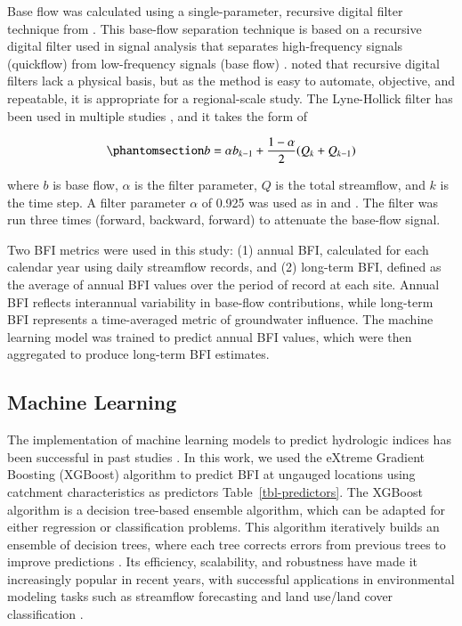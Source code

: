 \documentclass[
  authoryear,
  preprint,
  1p,
  onecolumn]{elsarticle}
\begin{document}
Base flow was calculated using a single-parameter, recursive digital
filter technique from \citet{nathan1990}. This base-flow separation
technique is based on a recursive digital filter used in signal analysis
that separates high-frequency signals (quickflow) from low-frequency
signals (base flow) \citep{lyne1979}. \citet{eckhardt2023} noted that
recursive digital filters lack a physical basis, but as the method is
easy to automate, objective, and repeatable, it is appropriate for a
regional-scale study. The Lyne-Hollick filter has been used in multiple
studies \citep{ARNOLD200021, santhi2008, bloomfield2009, singh2018}, and
it takes the form of

\begin{equation}\phantomsection\label{eq-bf-separate}{
b = \alpha b_{k-1} + \frac{1-\alpha}{2}(Q_k + Q_{k-1})
}\end{equation}

where \(b\) is base flow, \(\alpha\) is the filter parameter, \(Q\) is
the total streamflow, and \(k\) is the time step. A filter parameter
\(\alpha\) of 0.925 was used as in \citet{nathan1990} and
\citet{fuka2014ecohydrology}. The filter was run three times (forward,
backward, forward) to attenuate the base-flow signal.

Two BFI metrics were used in this study: (1) annual BFI, calculated for
each calendar year using daily streamflow records, and (2) long-term
BFI, defined as the average of annual BFI values over the period of
record at each site. Annual BFI reflects interannual variability in
base-flow contributions, while long-term BFI represents a time-averaged
metric of groundwater influence. The machine learning model was trained
to predict annual BFI values, which were then aggregated to produce
long-term BFI estimates.

\subsection{Machine Learning}\label{machine-learning}

The implementation of machine learning models to predict hydrologic
indices has been successful in past studies
\citep{singh2018, schmidt_ML_2020, Rozos2021Machine}. In this work, we
used the eXtreme Gradient Boosting (XGBoost) algorithm
\citep{chen2016xgboost} to predict BFI at ungauged locations using
catchment characteristics as predictors Table~\ref{tbl-predictors}. The
XGBoost algorithm is a decision tree-based ensemble algorithm, which can
be adapted for either regression or classification problems. This
algorithm iteratively builds an ensemble of decision trees, where each
tree corrects errors from previous trees to improve predictions
\citep{chen2016xgboost}. Its efficiency, scalability, and robustness
have made it increasingly popular in recent years, with successful
applications in environmental modeling tasks such as streamflow
forecasting \citep{szczepanek2022daily, ni2020streamflow} and land
use/land cover classification \citep{Georganos2018Very}.
\end{document}
